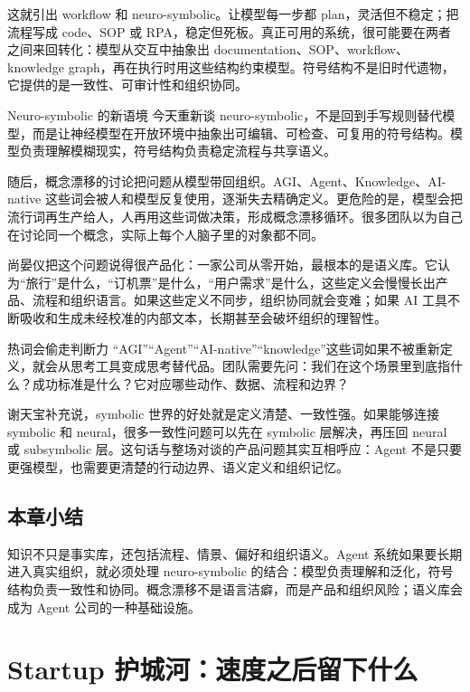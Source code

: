 \documentclass[a4paper]{article}
\begin{document}
这就引出 workflow 和 neuro-symbolic。让模型每一步都 plan，灵活但不稳定；把流程写成 code、SOP 或 RPA，稳定但死板。真正可用的系统，很可能要在两者之间来回转化：模型从交互中抽象出 documentation、SOP、workflow、knowledge graph，再在执行时用这些结构约束模型。符号结构不是旧时代遗物，它提供的是一致性、可审计性和组织协同。

\begin{importantbox}{Neuro-symbolic 的新语境}
今天重新谈 neuro-symbolic，不是回到手写规则替代模型，而是让神经模型在开放环境中抽象出可编辑、可检查、可复用的符号结构。模型负责理解模糊现实，符号结构负责稳定流程与共享语义。
\end{importantbox}

随后，概念漂移的讨论把问题从模型带回组织。AGI、Agent、Knowledge、AI-native 这些词会被人和模型反复使用，逐渐失去精确定义。更危险的是，模型会把流行词再生产给人，人再用这些词做决策，形成概念漂移循环。很多团队以为自己在讨论同一个概念，实际上每个人脑子里的对象都不同。

尚晏仪把这个问题说得很产品化：一家公司从零开始，最根本的是语义库。它认为“旅行”是什么，“订机票”是什么，“用户需求”是什么，这些定义会慢慢长出产品、流程和组织语言。如果这些定义不同步，组织协同就会变难；如果 AI 工具不断吸收和生成未经校准的内部文本，长期甚至会破坏组织的理智性。

\begin{warningbox}{热词会偷走判断力}
“AGI”“Agent”“AI-native”“knowledge”这些词如果不被重新定义，就会从思考工具变成思考替代品。团队需要先问：我们在这个场景里到底指什么？成功标准是什么？它对应哪些动作、数据、流程和边界？
\end{warningbox}

谢天宝补充说，symbolic 世界的好处就是定义清楚、一致性强。如果能够连接 symbolic 和 neural，很多一致性问题可以先在 symbolic 层解决，再压回 neural 或 subsymbolic 层。这句话与整场对谈的产品问题其实互相呼应：Agent 不是只要更强模型，也需要更清楚的行动边界、语义定义和组织记忆。

\subsection{本章小结}

知识不只是事实库，还包括流程、情景、偏好和组织语义。Agent 系统如果要长期进入真实组织，就必须处理 neuro-symbolic 的结合：模型负责理解和泛化，符号结构负责一致性和协同。概念漂移不是语言洁癖，而是产品和组织风险；语义库会成为 Agent 公司的一种基础设施。

\section{Startup 护城河：速度之后留下什么}
\end{document}
